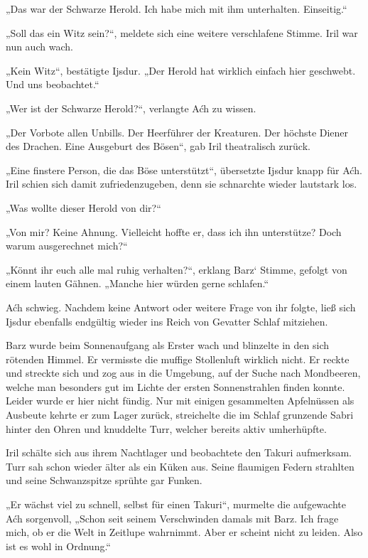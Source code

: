 „Das war der Schwarze Herold. Ich habe mich mit ihm unterhalten. Einseitig.“

„Soll das ein Witz sein?“, meldete sich eine weitere verschlafene Stimme. Iril war nun auch wach.

„Kein Witz“, bestätigte Ijsdur. „Der Herold hat wirklich einfach hier geschwebt. Und uns beobachtet.“

„Wer ist der Schwarze Herold?“, verlangte Aćh zu wissen.

„Der Vorbote allen Unbills. Der Heerführer der Kreaturen. Der höchste Diener des Drachen. Eine Ausgeburt des Bösen“, gab Iril theatralisch zurück.

„Eine finstere Person, die das Böse unterstützt“, übersetzte Ijsdur knapp für Aćh. Iril schien sich damit zufriedenzugeben, denn sie schnarchte wieder lautstark los.

„Was wollte dieser Herold von dir?“

„Von mir? Keine Ahnung. Vielleicht hoffte er, dass ich ihn unterstütze? Doch warum ausgerechnet mich?“

„Könnt ihr euch alle mal ruhig verhalten?“, erklang Barz‘ Stimme, gefolgt von einem lauten Gähnen. „Manche hier würden gerne schlafen.“

Aćh schwieg. Nachdem keine Antwort oder weitere Frage von ihr folgte, ließ sich Ijsdur ebenfalls endgültig wieder ins Reich von Gevatter Schlaf mitziehen.



\trennzeichen



Barz wurde beim Sonnenaufgang als Erster wach und blinzelte in den sich rötenden Himmel. Er vermisste die muffige Stollenluft wirklich nicht. Er reckte und streckte sich und zog aus in die Umgebung, auf der Suche nach Mondbeeren, welche man besonders gut im Lichte der ersten Sonnenstrahlen finden konnte. Leider wurde er hier nicht fündig. Nur mit einigen gesammelten Apfelnüssen als Ausbeute kehrte er zum Lager zurück, streichelte die im Schlaf grunzende Sabri hinter den Ohren und knuddelte Turr, welcher bereits aktiv umherhüpfte.

Iril schälte sich aus ihrem Nachtlager und beobachtete den Takuri aufmerksam. Turr sah schon wieder älter als ein Küken aus. Seine flaumigen Federn strahlten und seine Schwanzspitze sprühte gar Funken.

„Er wächst viel zu schnell, selbst für einen Takuri“, murmelte die aufgewachte Aćh sorgenvoll, „Schon seit seinem Verschwinden damals mit Barz. Ich frage mich, ob er die Welt in Zeitlupe wahrnimmt. Aber er scheint nicht zu leiden. Also ist es wohl in Ordnung.“

